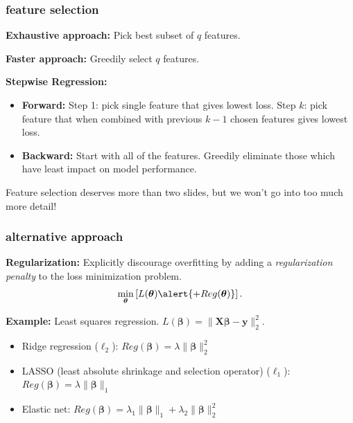 \documentclass[handout,compress]{beamer}
\newcommand{\bs}[1]{\boldsymbol{#1}}
\newcommand{\bv}[1]{\mathbf{#1}}
\begin{document}
\begin{frame}
	\frametitle{feature selection}
	\textbf{Exhaustive approach:} Pick best subset of $q$ features. 
	
	\textbf{Faster approach:} Greedily select $q$ features. 
	
	\textbf{Stepwise Regression:}
	\begin{itemize}
		\item \textbf{Forward:} Step 1: pick single feature that gives lowest loss. Step $k$: pick feature that when combined with previous $k-1$ chosen features gives lowest loss.
		\item \textbf{Backward:} Start with all of the features. Greedily eliminate those which have least impact on model performance.
	\end{itemize}

	Feature selection deserves more than two slides, but we won't go into too much more detail!
\end{frame}

\begin{frame}
	\frametitle{alternative approach}
	\textbf{Regularization:}
	Explicitly discourage overfitting by adding a \emph{regularization penalty} to the loss minimization problem.  
	\begin{align*}
		\min_{\bs{\theta}} \left[ L(\bs{\theta}) \alert{+ Reg(\bs{\theta})} \right].
	\end{align*}
	
	\textbf{Example:} Least squares regression. $L(\bs{\beta}) = \|\bv{X}\bs{\beta} - \bv{y}\|_2^2$.
	\begin{itemize}
		\item Ridge regression ($\ell_2$): \alert{$Reg(\bs{\beta}) = \lambda \|\bs{\beta}\|_2^2$}
		\item LASSO (least absolute shrinkage and selection operator) ($\ell_1$): \alert{$Reg(\bs{\beta}) = \lambda \|\bs{\beta}\|_1$}
		\item Elastic net: \alert{$Reg(\bs{\beta}) = \lambda_1 \|\bs{\beta}\|_1 + \lambda_2 \|\bs{\beta}\|_2^2$}
	\end{itemize}
\end{frame}
\end{document}
